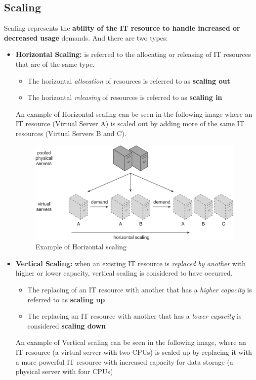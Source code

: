 \subsection{Scaling}
Scaling represents the \textbf{ability of the IT resource to handle increased or decreased usage} demands. And there are two types:
\begin{itemize}
    \item \textbf{Horizontal Scaling:} is referred to the allocating or releasing of IT resources that are of the same type.
    \begin{itemize}
        \item The horizontal \textit{allocation} of resources is referred to as \textbf{scaling out}
        \item The horizontal \textit{releasing} of resources is referred to as \textbf{scaling in}
    \end{itemize}
    An example of Horizontal scaling can be seen in the following image where an IT resource (Virtual Server A) is scaled out by adding more of the same IT resources (Virtual Servers B and C).

\begin{figure}[!h]
    \centering
    \includegraphics[width=.60\linewidth]{images/CloudComputing/HorizontalScaling.png}
    \caption{Example of Horizontal scaling}
\end{figure}
    
    \item \textbf{Vertical Scaling:} when an existing IT resource is \textit{replaced by another} with higher or lower capacity, vertical scaling is considered to have occurred.
    \begin{itemize}
        \item The replacing of an IT resource with another that has a \textit{higher capacity} is referred to as \textbf{scaling up}
        \item The replacing an IT resource with another that has a \textit{lower capacity} is considered \textbf{scaling down}
    \end{itemize}
    An example of Vertical scaling can be seen in the following image, where an IT resource (a virtual server with two CPUs) is scaled up by replacing it with a more powerful IT resource with increased capacity for data storage (a physical server with four CPUs)
    

\end{itemize}

